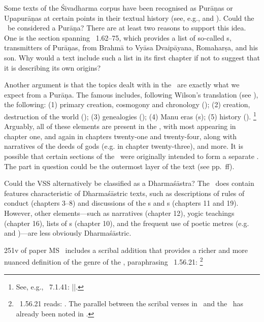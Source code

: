 Some texts of the Śivadharma corpus have been recognised as Purāṇas 
or Upapurāṇas at certain points in their textual history 
(see, e.g.,  and \citeyear{HazraSDhU}).
Could the \VSS\ be considered a Purāṇa? There are at least two reasons to support this idea.
One is the section spanning \VSS\ 1.62--75, which provides a list of so-called s,
transmitters of Purāṇas, from Brahmā to Vyāsa Dvaipāyana, Romaharṣa,
and his son.
Why would a text include such a list in its first chapter 
if not to suggest that it is describing its own origins?

Another argument is that the topics dealt with in the \VSS\ are exactly what
we expect from a Purāṇa. The famous  includes,
following Wilson's translation (see ), the following:
(1) primary creation, cosmogony and chronology (); 
(2) creation, destruction of the world ();
(3) genealogies (); 
(4) Manu eras (s);
(5) history ().%
		\footnote{See, e.g., \SIVP\ 7.1.41: 
				 ||.}
Arguably, all of these elements are present in the \VSS,
with most appearing in chapter one, and again in chapters twenty-one and
twenty-four, along with narratives of the deeds of gods
(e.g. in chapter twenty-three), and more. It is possible
that certain sections of the \VSS\ were originally intended
to form a separate . The part in question could
be the outermost layer of the text (see pp.~\pageref{structure}ff).



Could the VSS alternatively be classified as a Dharmaśāstra?
The \VSS\ does contain features characteristic of Dharmaśāstric texts,
such as descriptions of rules of conduct (chapters 3--8) and discussions of the 
s and s (chapters 11 and 19).
However, other elements---such as narratives (chapter 12),
yogic teachings (chapter 16), lists of s (chapter 10), 
and the frequent use of poetic metres (e.g.  and
)---are less obviously Dharmaśāstric.

\Fol251v of paper MS \msPaperA\ includes a scribal addition 
that provides a richer and more nuanced definition of the genre of the \VSS, 
paraphrasing \MBh\ 1.56.21:%
        \footnote{\MBh\ 1.56.21 reads:
                 . 
                      The parallel between the scribal verses in \msPaperA\ and the 
                      \MBH\ has already been noted in 
                      .}

